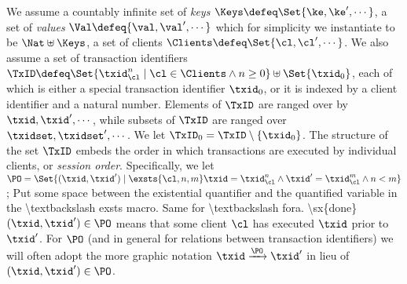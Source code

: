 

We assume a countably infinite set of \emph{keys} $\Keys \defeq \Set{\ke, \ke', \cdots}$, 
a set of \emph{values} $\Val \defeq \{\val, \val', \cdots\}$ which for simplicity we instantiate to be 
$\Nat \uplus \Keys$, a set of clients $\Clients \defeq \Set{\cl, \cl',\cdots}$. 
We also assume a set of transaction identifiers $\TxID \defeq \Set{ \txid_{\cl}^{n} \mid \cl \in \Clients \wedge n \geq 0 } 
\uplus \Set{\txid_{0}}$,
each of which is either a special transaction identifier $\txid_0$, 
or it is indexed by a client identifier and a natural number. 
Elements of $\TxID$ are ranged over by $\txid, \txid', \cdots$, 
while subsets of $\TxID$ are ranged over $\txidset, \txidset', \cdots$. 
We let $\TxID_{0} = \TxID \setminus \{ \txid_0\}$.
The structure of the set $\TxID$  
embeds the order in which transactions are executed by individual clients, or \emph{session order}. 
Specifically, we let $\PO = \Set{ (\txid, \txid') \mid \exsts{ \cl, n,m } \txid = \txid_{\cl}^{n} \wedge \txid' = \txid_{\cl}^{m} \wedge n < m}$; 
\ac{Put some space between the existential quantifier and the quantified variable in the \textbackslash exsts macro. 
Same for \textbackslash fora.
\sx{done}
}
$(\txid, \txid') \in \PO$ means that 
some client $\cl$ has executed $\txid$ prior to $\txid'$. For $\PO$ (and in general  
for relations between transaction identifiers) we will often adopt the more graphic notation 
$\txid \xrightarrow{\PO} \txid'$ in lieu of $(\txid, \txid') \in \PO$.

